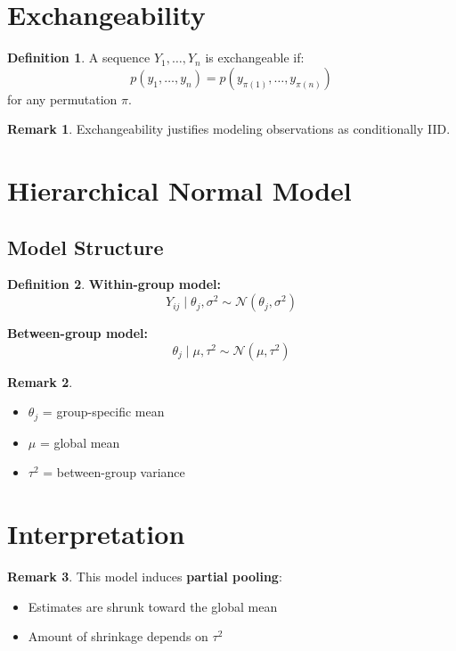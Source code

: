 \documentclass[12pt,oneside]{book}
\numberwithin{equation}{section}
\theoremstyle{definition}
\newtheorem{definition}{Definition}[section]
\newtheorem{remark}{Remark}[section]
\theoremstyle{plain}
\theoremstyle{remark}
\newcommand{\Normal}{\mathcal{N}}
\begin{document}
\section{Exchangeability}

\begin{definition}
A sequence $Y_1, \dots, Y_n$ is exchangeable if:
$$
p(y_1, \dots, y_n)
=
p(y_{\pi(1)}, \dots, y_{\pi(n)})
$$
for any permutation $\pi$.
\end{definition}

\begin{remark}
Exchangeability justifies modeling observations as conditionally IID.
\end{remark}

\section{Hierarchical Normal Model}

\subsection{Model Structure}

\begin{definition}
\textbf{Within-group model:}
$$
Y_{ij} \mid \theta_j, \sigma^2 \sim \Normal(\theta_j, \sigma^2)
$$

\textbf{Between-group model:}
$$
\theta_j \mid \mu, \tau^2 \sim \Normal(\mu, \tau^2)
$$
\end{definition}

\begin{remark}
\begin{itemize}
\item $\theta_j$ = group-specific mean
\item $\mu$ = global mean
\item $\tau^2$ = between-group variance
\end{itemize}
\end{remark}

\section{Interpretation}

\begin{remark}
This model induces \textbf{partial pooling}:
\begin{itemize}
\item Estimates are shrunk toward the global mean
\item Amount of shrinkage depends on $\tau^2$
\end{itemize}
\end{remark}
\end{document}

